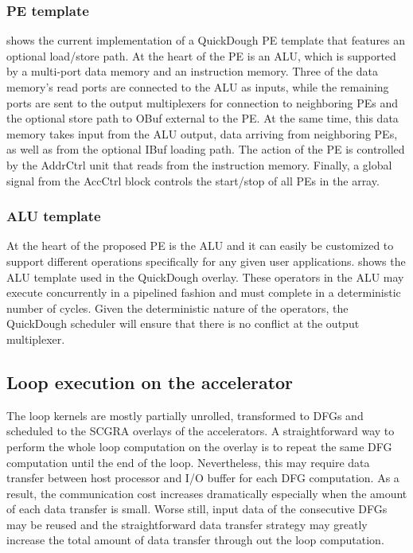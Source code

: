 \subsubsection{PE template}
 shows the current implementation of a QuickDough PE template that features an optional load/store path. At the heart of the PE is an ALU, which is supported by a multi-port data memory and an instruction memory. Three of the data memory's read ports are connected to the ALU as inputs, while the remaining ports are sent to the output multiplexers for connection to neighboring PEs and the optional store path to OBuf external to the PE. At the same time, this data memory takes input from the ALU output, data arriving from neighboring PEs, as well as from the optional IBuf loading path. The action of the PE is controlled by the AddrCtrl unit that reads from the instruction memory. Finally, a global signal from the AccCtrl block controls the start/stop of all PEs in the array.

\subsubsection{ALU template}
At the heart of the proposed PE is the ALU and it can easily be customized to support different operations specifically for any given user applications.  shows the ALU template used in the QuickDough overlay. These operators in the ALU may execute concurrently in a pipelined fashion and must complete in a deterministic number of cycles. Given the deterministic nature of the operators, the QuickDough scheduler will ensure that there is no conflict at the output multiplexer.

\subsection{Loop execution on the accelerator}
The loop kernels are mostly partially unrolled, transformed to DFGs and scheduled to the SCGRA overlays of the accelerators. A straightforward way to perform the whole loop computation on the overlay is to repeat the same DFG computation until the end of the loop. Nevertheless, this may require data transfer between host processor and I/O buffer for each DFG computation. As a result, the communication cost increases dramatically especially when the amount of each data transfer is small. Worse still, input data of the consecutive DFGs may be reused and the straightforward data transfer strategy may greatly increase the total amount of data transfer through out the loop computation. 

